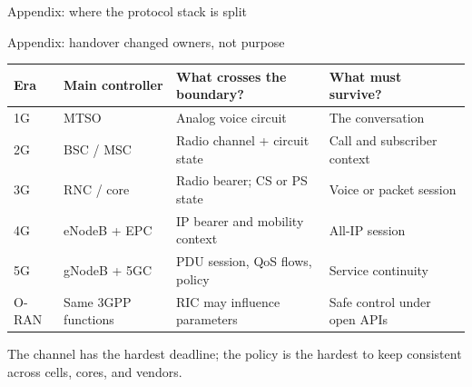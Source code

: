 \begin{frame}{Appendix: where the protocol stack is split}
  \centering

  \vspace{0.5em}
\end{frame}

\begin{frame}{Appendix: handover changed owners, not purpose}
  \scriptsize
  \renewcommand{\arraystretch}{1.20}
  \vspace{0.15em}
  \begin{tabularx}{\textwidth}{
      >{\raggedright\arraybackslash}p{1.05cm}
      >{\raggedright\arraybackslash}p{3.1cm}
      >{\raggedright\arraybackslash}X
      >{\raggedright\arraybackslash}X}
    \toprule
    \textbf{Era} & \textbf{Main controller} & \textbf{What crosses the boundary?} & \textbf{What must survive?} \\
    \midrule
    1G & MTSO & Analog voice circuit & The conversation \\
    2G & BSC / MSC & Radio channel + circuit state & Call and subscriber context \\
    3G & RNC / core & Radio bearer; CS or PS state & Voice or packet session \\
    4G & eNodeB + EPC & IP bearer and mobility context & All-IP session \\
    5G & gNodeB + 5GC & PDU session, QoS flows, policy & Service continuity \\
    O-RAN & Same 3GPP functions & RIC may influence parameters & Safe control under open APIs \\
    \bottomrule
  \end{tabularx}

  \vspace{0.4em}
     {The channel has the hardest deadline; the policy is the hardest to keep
      consistent across cells, cores, and vendors.}
\end{frame}

